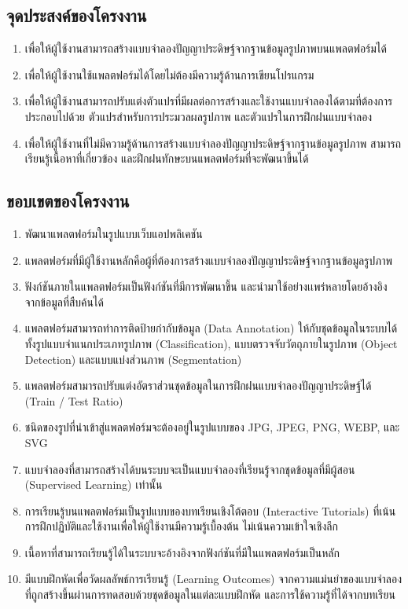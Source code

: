 \documentclass[12pt,oneside,openright,a4paper]{cpe-thai-project}
\begin{document}
\subsection{จุดประสงค์ของโครงงาน}
\vskip10pt
\begin{enumerate}
\item  เพื่อให้ผู้ใช้งานสามารถสร้างแบบจำลองปัญญาประดิษฐ์จากฐานข้อมูลรูปภาพบนแพลตฟอร์มได้
\item  เพื่อให้ผู้ใช้งานใช้แพลตฟอร์มได้โดยไม่ต้องมีความรู้ด้านการเขียนโปรแกรม
\item เพื่อให้ผู้ใช้งานสามารถปรับแต่งตัวแปรที่มีผลต่อการสร้างและใช้งานแบบจำลองได้ตามที่ต้องการ ประกอบไปด้วย ตัวแปรสำหรับการประมวลผลรูปภาพ และตัวแปรในการฝึกฝนแบบจำลอง
\item เพื่อให้ผู้ใช้งานที่ไม่มีความรู้ด้านการสร้างแบบจำลองปัญญาประดิษฐ์จากฐานข้อมูลรูปภาพ สามารถเรียนรู้เนื้อหาที่เกี่ยวข้อง และฝึกฝนทักษะบนแพลตฟอร์มที่จะพัฒนาขึ้นได้
\end{enumerate}

\subsection{ขอบเขตของโครงงาน}
\vskip10pt
\begin{enumerate}
\item พัฒนาแพลตฟอร์มในรูปแบบเว็บแอปพลิเคชัน
\item แพลตฟอร์มที่มีผู้ใช้งานหลักคือผู้ที่ต้องการสร้างแบบจำลองปัญญาประดิษฐ์จากฐานข้อมูลรูปภาพ
\item ฟังก์ชันภายในแพลตฟอร์มเป็นฟังก์ชันที่มีการพัฒนาขึ้น และนำมาใช้อย่างเเพร่หลายโดยอ้างอิงจากข้อมูลที่สืบค้นได้
\item แพลตฟอร์มสามารถทำการติดป้ายกำกับข้อมูล (Data Annotation) ให้กับชุดข้อมูลในระบบได้ทั้งรูปแบบจำแนกประเภทรูปภาพ (Classification), แบบตรวจจับวัตถุภายในรูปภาพ (Object Detection) และแบบแบ่งส่วนภาพ (Segmentation)
\item แพลตฟอร์มสามารถปรับแต่งอัตราส่วนชุดข้อมูลในการฝึกฝนแบบจำลองปัญญาประดิษฐ์ได้ (Train / Test Ratio)
\item ชนิดของรูปที่นำเข้าสู่แพลตฟอร์มจะต้องอยู่ในรูปแบบของ JPG, JPEG, PNG, WEBP, และ SVG
\item แบบจำลองที่สามารถสร้างได้บนระบบจะเป็นแบบจำลองที่เรียนรู้จากชุดข้อมูลที่มีผู้สอน (Supervised Learning) เท่านั้น
\item การเรียนรู้บนแพลตฟอร์มเป็นรูปแบบของบทเรียนเชิงโต้ตอบ (Interactive Tutorials) ที่เน้นการฝึกปฏิบัติและใช้งานเพื่อให้ผู้ใช้งานมีความรู้เบื้องต้น ไม่เน้นความเข้าใจเชิงลึก
\item เนื้อหาที่สามารถเรียนรู้ได้ในระบบจะอ้างอิงจากฟังก์ชันที่มีในแพลตฟอร์มเป็นหลัก
\item มีแบบฝึกหัดเพื่อวัดผลลัพธ์การเรียนรู้ (Learning Outcomes) จากความแม่นยำของแบบจำลองที่ถูกสร้างขึ้นผ่านการทดสอบด้วยชุดข้อมูลในแต่ละแบบฝึกหัด และการใช้ความรู้ที่ได้จากบทเรียน
\end{enumerate}
\end{document}

